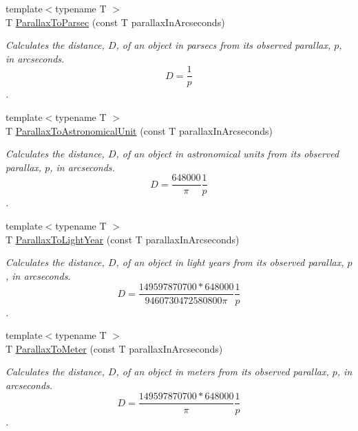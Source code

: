\begin{DoxyCompactItemize}
{\footnotesize template$<$typename T $>$ }\\T \mbox{\hyperlink{group___e_g_x_phys-_astrophysic-_parallax_gab42dbec142e1a47925fc45e899845861}{Parallax\+To\+Parsec}} (const T parallax\+In\+Arcseconds)
\begin{DoxyCompactList}\small\item\em Calculates the distance, $D$, of an object in parsecs from its observed parallax, $p$, in arcseconds. \[ D=\dfrac{1}{p}\]. \end{DoxyCompactList}\item 
{\footnotesize template$<$typename T $>$ }\\T \mbox{\hyperlink{group___e_g_x_phys-_astrophysic-_parallax_gaee6df9899f30baa3d659597abe89066a}{Parallax\+To\+Astronomical\+Unit}} (const T parallax\+In\+Arcseconds)
\begin{DoxyCompactList}\small\item\em Calculates the distance, $D$, of an object in astronomical units from its observed parallax, $p$, in arcseconds. \[ D=\dfrac{648000}{\pi}\dfrac{1}{p}\]. \end{DoxyCompactList}\item 
{\footnotesize template$<$typename T $>$ }\\T \mbox{\hyperlink{group___e_g_x_phys-_astrophysic-_parallax_gacaec31498f264e2a1dc285062a394de2}{Parallax\+To\+Light\+Year}} (const T parallax\+In\+Arcseconds)
\begin{DoxyCompactList}\small\item\em Calculates the distance, $D$, of an object in light years from its observed parallax, $p$, in arcseconds. \[ D=\dfrac{149597870700 * 648000}{9460730472580800 \pi} \dfrac{1}{p}\]. \end{DoxyCompactList}\item 
{\footnotesize template$<$typename T $>$ }\\T \mbox{\hyperlink{group___e_g_x_phys-_astrophysic-_parallax_ga94912bf8b98a04cccab8ef19eaa89b6a}{Parallax\+To\+Meter}} (const T parallax\+In\+Arcseconds)
\begin{DoxyCompactList}\small\item\em Calculates the distance, $D$, of an object in meters from its observed parallax, $p$, in arcseconds. \[ D=\dfrac{149597870700 * 648000}{\pi}\dfrac{1}{p}\]. \end{DoxyCompactList}\item 
\mbox{\label{namespace_e_g_x_phys_a2085f91170baba79a7fcc8a0ba77d1eb}} 

\end{DoxyCompactItemize}
